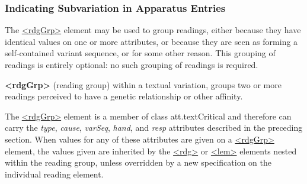 \subsubsection[{Indicating Subvariation in Apparatus Entries}]{Indicating Subvariation in Apparatus Entries}\label{TCAPSU}\par
The \hyperref[TEI.rdgGrp]{<rdgGrp>} element may be used to group readings, either because they have identical values on one or more attributes, or because they are seen as forming a self-contained variant sequence, or for some other reason. This grouping of readings is entirely optional: no such grouping of readings is required. 
\begin{sansreflist}
  
\item [\textbf{<rdgGrp>}] (reading group) within a textual variation, groups two or more readings perceived to have a genetic relationship or other affinity.
\end{sansreflist}
\par
The \hyperref[TEI.rdgGrp]{<rdgGrp>} element is a member of class \textsf{att.textCritical} and therefore can carry the {\itshape type}, {\itshape cause}, {\itshape varSeq}, {\itshape hand}, and {\itshape resp} attributes described in the preceding section. When values for any of these attributes are given on a \hyperref[TEI.rdgGrp]{<rdgGrp>} element, the values given are inherited by the \hyperref[TEI.rdg]{<rdg>} or \hyperref[TEI.lem]{<lem>} elements nested within the reading group, unless overridden by a new specification on the individual reading element.\par
